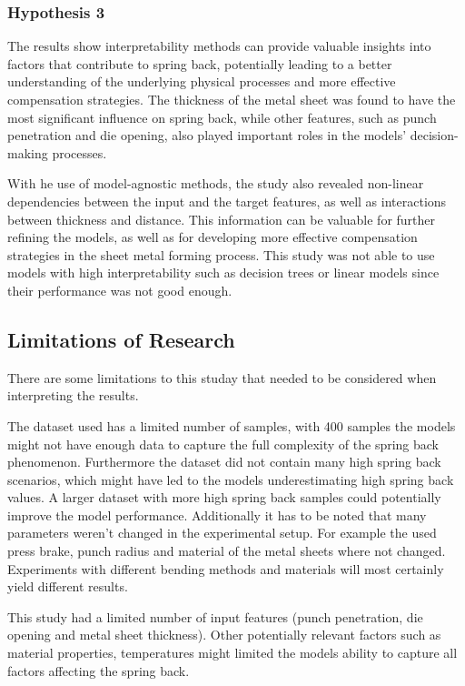 \subsubsection{Hypothesis 3}
The results show interpretability methods can provide valuable insights into factors that contribute to spring back,
potentially leading to a better understanding of the underlying physical processes and more effective compensation
strategies.
The thickness of the metal sheet was found to have the most significant influence on spring back, while other
features, such as punch penetration and die opening, also played important roles in the models' decision-making
processes.

With he use of model-agnostic methods, the study also revealed non-linear dependencies between the input and the
target features, as well as interactions between thickness and distance.
This information can be valuable for further refining the models, as well as for developing more effective
compensation strategies in the sheet metal forming process.
This study was not able to use models with high interpretability such as decision trees or linear models
since their performance was not good enough.

\subsection{Limitations of Research}\label{subsec:limitations-of-research}
There are some limitations to this studay that needed to be considered when interpreting the results.

The dataset used has a limited number of samples, with 400 samples the models might not have enough data to capture
the full complexity of the spring back phenomenon.
Furthermore the dataset did not contain many high spring back scenarios, which might have led to the models
underestimating high spring back values.
A larger dataset with more high spring back samples could potentially improve the model performance.
Additionally it has to be noted that many parameters weren't changed in the experimental setup.
For example the used press brake, punch radius and material of the metal sheets where not changed.
Experiments with different bending methods and materials will most certainly yield different results.

This study had a limited number of input features (punch penetration, die opening and
metal sheet thickness).
Other potentially relevant factors such as material properties, temperatures might limited the models ability to
capture all factors affecting the spring back.

